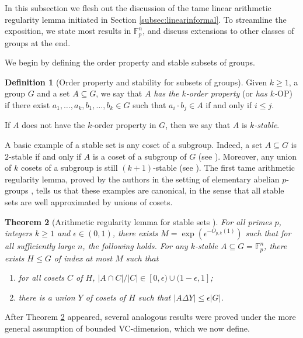 \documentclass[12pt,oneside,british,a4wide]{amsart}
\newtheorem{theorem}{Theorem}[section]
\numberwithin{equation}{section}
\theoremstyle{definition}
\newtheorem{definition}[theorem]{Definition}
\def\F{\mathbb{F}}
\def\OP{\mathrm{OP}}
\def\e{\epsilon}
\begin{document}
In this subsection we flesh out the discussion of the tame linear arithmetic regularity lemma initiated in Section \ref{subsec:linearinformal}.  To streamline the exposition, we state most results in $\F_p^n$, and discuss extensions to other classes of groups at the end.  

We begin by defining the order property and stable subsets of groups.

\begin{definition}[Order property and stability for subsets of groups]\label{def:stable}
Given $k\geq 1$, a group $G$ and a set $A\subseteq G$, we say that $A$ \emph{has the $k$-order property} (or \emph{has $k$-$\OP$}) if there exist $a_1,\ldots, a_k,b_1,\ldots, b_k\in G$ such that $a_i\cdot b_j\in A$ if and only if $i\leq j$.  

If $A$ does not have the $k$-order property in $G$, then we say that $A$ is \emph{$k$-stable}. 
\end{definition}

A basic example of a stable set is any coset of a subgroup. Indeed, a set $A\subseteq G$ is $2$-stable if and only if $A$ is a coset of a subgroup of $G$ (see \cite{Terry.2019}).  Moreover, any union of $k$ cosets of a subgroup is still $(k+1)$-stable (see \cite[Lemma 1.5]{Sanders.2018}). The first tame arithmetic regularity lemma, proved by the authors in the setting of elementary abelian $p$-groups \cite{Terry.2019}, tells us that these examples are canonical, in the sense that all stable sets are well approximated by unions of cosets. 



\begin{theorem}[Arithmetic regularity lemma for stable sets \cite{Terry.2019}]\label{thm:stablegps}
For all primes $p$, integers $k\geq 1$ and $\e\in (0,1)$, there exists $M=\exp(\e^{-O_{p,k}(1)})$ such that for all sufficiently large $n$, the following holds.  For any $k$-stable $A\subseteq G= \F_p^n$, there exists $H\leqslant G$ of index at most $M$ such that  
\begin{enumerate}[label=\normalfont(\roman*)] 
\item for all cosets $C$ of $H$, $|A\cap C|/|C|\in [0,\e)\cup (1-\e,1]$;
\item there is a union $Y$ of cosets of $H$ such that $|A\Delta Y|\leq \e|G|$. 
\end{enumerate}
\end{theorem}




After Theorem \ref{thm:stablegps} appeared, several analogous results were proved under the more general assumption of bounded VC-dimension, which we now define. 
\end{document}
